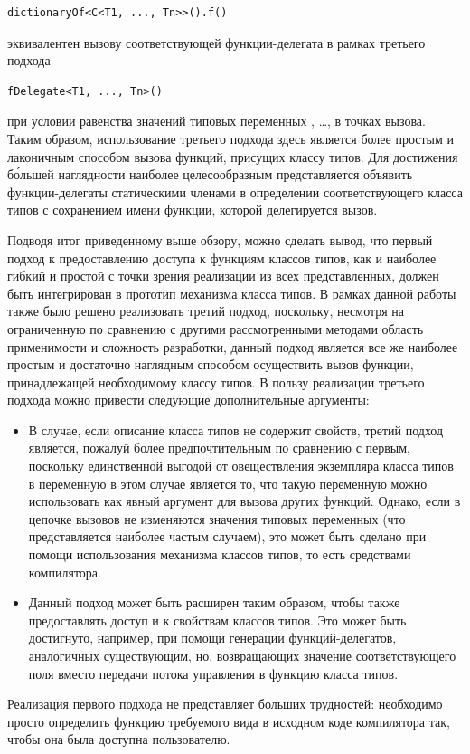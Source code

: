 \begin{lstlisting}[style={wo_caption}]
dictionaryOf<C<T1, ..., Tn>>().f()
\end{lstlisting}
эквивалентен вызову соответствующей функции-делегата  в рамках третьего подхода  
\begin{lstlisting}[style={wo_caption}]
fDelegate<T1, ..., Tn>()
\end{lstlisting}
при условии равенства значений типовых переменных , \ldots,  в точках вызова. Таким образом, использование третьего подхода здесь является более простым и лаконичным способом вызова функций, присущих классу типов. Для достижения б\'{о}льшей наглядности наиболее целесообразным представляется объявить функции-делегаты статическими членами в определении соответствующего класса типов с сохранением имени функции, которой делегируется вызов. 

Подводя итог приведенному выше обзору, можно сделать вывод, что первый подход к предоставлению доступа к функциям классов типов, как и наиболее гибкий и простой с точки зрения реализации из всех представленных, должен быть интегрирован в прототип механизма класса типов. В рамках данной работы также было решено реализовать третий подход, поскольку, несмотря на ограниченную по сравнению с другими рассмотренными методами область применимости и сложность разработки, данный подход является все же наиболее простым и достаточно наглядным способом осуществить вызов функции, принадлежащей необходимому классу типов. В пользу реализации третьего подхода можно привести следующие дополнительные аргументы:
\begin{itemize}
    \item В случае, если описание класса типов не содержит свойств, третий подход является, пожалуй более предпочтительным по сравнению с первым, поскольку единственной выгодой от овеществления экземпляра класса типов в переменную в этом случае является то, что такую переменную можно использовать как явный аргумент для вызова других функций. Однако, если в цепочке вызовов не изменяются значения типовых переменных (что представляется наиболее частым случаем), это может быть сделано при помощи использования механизма классов типов, то есть средствами компилятора. 
    \item Данный подход может быть расширен таким образом, чтобы также предоставлять доступ и к свойствам классов типов. Это может быть достигнуто, например, при помощи генерации функций-делегатов, аналогичных существующим, но, возвращающих значение соответствующего поля вместо передачи потока управления в функцию класса типов.   
\end{itemize}
Реализация первого подхода не представляет больших трудностей: необходимо просто определить функцию требуемого вида в исходном коде компилятора так, чтобы она была доступна пользователю. 

